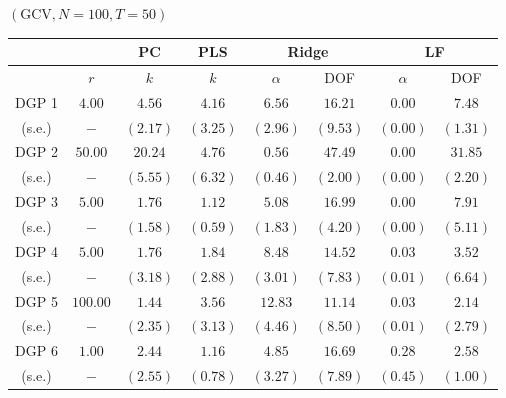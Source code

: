 
    \begin{center} $(\mathrm{GCV}, N=100, T=50)$ \
        \begin{tabular}{cccccccc}
            \hline \hline 
            & & PC & PLS & \multicolumn{2}{c}{Ridge} & \multicolumn{2}{c}{LF} \\
            \hline 
            & $r$ & $k$ & $k$ & $\alpha$ & DOF & $\alpha$ & DOF \\
            \hline 
            DGP 1 & $4.00$ & $4.56$ & $4.16$ & $6.56$ & $16.21$ & $0.00$ & $7.48$ \\
            (s.e.) & $-$ & $(2.17)$ & $(3.25)$ & $(2.96)$ & $(9.53)$ & $(0.00)$ & $(1.31)$ \\
            DGP 2 & $50.00$ & $20.24$ & $4.76$ & $0.56$ & $47.49$ & $0.00$ & $31.85$ \\
            (s.e.) & $-$ & $(5.55)$ & $(6.32)$ & $(0.46)$ & $(2.00)$ & $(0.00)$ & $(2.20)$ \\
            DGP 3 & $5.00$ & $1.76$ & $1.12$ & $5.08$ & $16.99$ & $0.00$ & $7.91$ \\
            (s.e.) & $-$ & $(1.58)$ & $(0.59)$ & $(1.83)$ & $(4.20)$ & $(0.00)$ & $(5.11)$ \\
            DGP 4 & $5.00$ & $1.76$ & $1.84$ & $8.48$ & $14.52$ & $0.03$ & $3.52$ \\
            (s.e.) & $-$ & $(3.18)$ & $(2.88)$ & $(3.01)$ & $(7.83)$ & $(0.01)$ & $(6.64)$ \\
            DGP 5 & $100.00$ & $1.44$ & $3.56$ & $12.83$ & $11.14$ & $0.03$ & $2.14$ \\
            (s.e.) & $-$ & $(2.35)$ & $(3.13)$ & $(4.46)$ & $(8.50)$ & $(0.01)$ & $(2.79)$ \\
            DGP 6 & $1.00$ & $2.44$ & $1.16$ & $4.85$ & $16.69$ & $0.28$ & $2.58$ \\
            (s.e.) & $-$ & $(2.55)$ & $(0.78)$ & $(3.27)$ & $(7.89)$ & $(0.45)$ & $(1.00)$ \\
            \hline
        \end{tabular}
    \end{center}
    